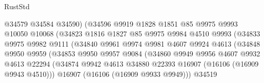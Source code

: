 \begin{lexlean}{RustStd}
\begin{coremodule}
                                  @34579
                                  @34584
                                  @34590)
                                (@34596
                                  @9919
                                  @1828
                                  @1851
                                  @85
                                  @9975
                                  @9993
                                  @10050
                                  @10068
                                  (@34823
                                    @1816
                                    @1827
                                    @85
                                    @9975
                                    @9984
                                    @4510
                                    @9993
                                    (@34833
                                      @9975
                                      @9982
                                      @9111
                                      (@34840
                                        @9961
                                        @9974
                                        @9981
                                        @4607
                                        @9924
                                        @4613
                                        (@34848
                                          @9950
                                          @9959
                                          (@34853
                                            @9950
                                            @9957
                                            @9084
                                            (@34860
                                              @9949
                                              @9956
                                              @4607
                                              @9932
                                              @4613
                                              @22294
                                              (@34874
                                                @9942
                                                @4613
                                                @34880
                                                @22393
                                                @16907
                                                (@16106 (@16909 @9943 @4510)))
                                              @16907
                                              (@16106 (@16909 @9933 @9949)))
                                            @34519

\end{coremodule}
\end{lexlean}
